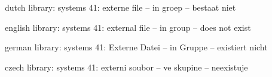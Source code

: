 

\unprotect

\startmessages  dutch  library: systems
     41: externe file -- in groep -- bestaat niet
\stopmessages

\startmessages  english  library: systems
     41: external file -- in group -- does not exist
\stopmessages

\startmessages  german  library: systems
     41: Externe Datei -- in Gruppe -- existiert nicht
\stopmessages

\startmessages  czech  library: systems
     41: externi soubor -- ve skupine -- neexistuje
\stopmessages


